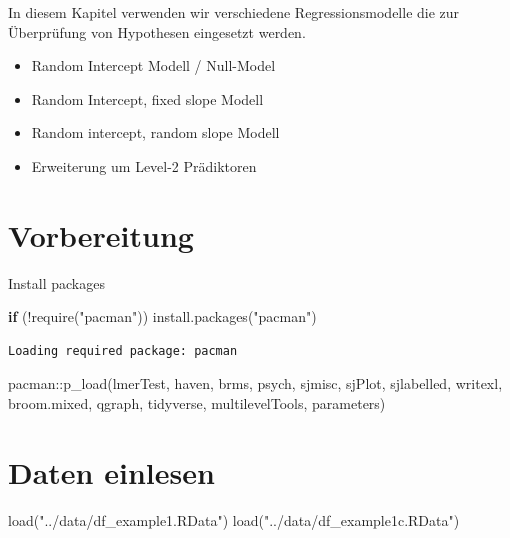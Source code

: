 \documentclass[
  letterpaper,
  DIV=11,
  numbers=noendperiod]{scrreprt}
\newenvironment{Shaded}{\begin{snugshade}}{\end{snugshade}}
\newcommand{\ControlFlowTok}[1]{\textcolor[rgb]{0.00,0.23,0.31}{\textbf{#1}}}
\newcommand{\FunctionTok}[1]{\textcolor[rgb]{0.28,0.35,0.67}{#1}}
\newcommand{\NormalTok}[1]{\textcolor[rgb]{0.00,0.23,0.31}{#1}}
\newcommand{\SpecialCharTok}[1]{\textcolor[rgb]{0.37,0.37,0.37}{#1}}
\newcommand{\StringTok}[1]{\textcolor[rgb]{0.13,0.47,0.30}{#1}}
\providecommand{\tightlist}{%
  \setlength{\itemsep}{0pt}\setlength{\parskip}{0pt}}\usepackage{longtable,booktabs,array}
\begin{document}
In diesem Kapitel verwenden wir verschiedene Regressionsmodelle die zur
Überprüfung von Hypothesen eingesetzt werden.

\begin{itemize}
\tightlist
\item
  Random Intercept Modell / Null-Model
\item
  Random Intercept, fixed slope Modell
\item
  Random intercept, random slope Modell
\item
  Erweiterung um Level-2 Prädiktoren
\end{itemize}

\section{Vorbereitung}\label{vorbereitung}

Install packages

\begin{Shaded}
\begin{Highlighting}[]
\ControlFlowTok{if}\NormalTok{ (}\SpecialCharTok{!}\FunctionTok{require}\NormalTok{(}\StringTok{"pacman"}\NormalTok{)) }\FunctionTok{install.packages}\NormalTok{(}\StringTok{"pacman"}\NormalTok{)}
\end{Highlighting}
\end{Shaded}

\begin{verbatim}
Loading required package: pacman
\end{verbatim}

\begin{Shaded}
\begin{Highlighting}[]
\NormalTok{pacman}\SpecialCharTok{::}\FunctionTok{p\_load}\NormalTok{(lmerTest, haven, brms, psych,}
\NormalTok{               sjmisc, sjPlot, sjlabelled, writexl, broom.mixed, qgraph,}
\NormalTok{               tidyverse, multilevelTools, parameters)}
\end{Highlighting}
\end{Shaded}

\section{Daten einlesen}\label{daten-einlesen-1}

\begin{Shaded}
\begin{Highlighting}[]
\FunctionTok{load}\NormalTok{(}\StringTok{"../data/df\_example1.RData"}\NormalTok{)}
\FunctionTok{load}\NormalTok{(}\StringTok{"../data/df\_example1c.RData"}\NormalTok{)}
\end{Highlighting}
\end{Shaded}
\end{document}
